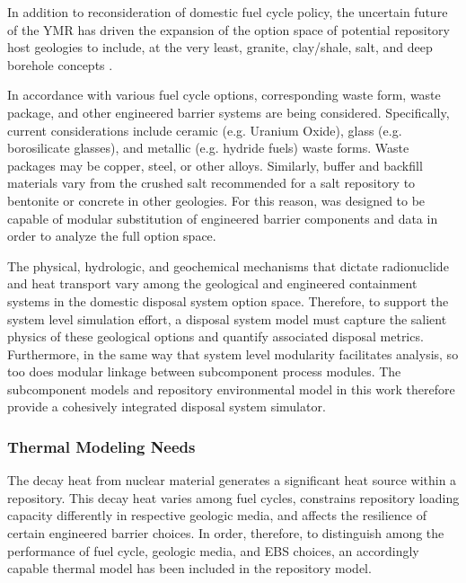 

In addition to reconsideration of domestic fuel cycle policy, the uncertain 
future of the \gls{YMR} has driven the expansion of the option space of 
potential repository host geologies to include, at the very least, granite, 
clay/shale, salt, and deep borehole concepts \cite{nutt_used_2010}. 


In accordance with various fuel cycle options, corresponding waste form, waste 
package, and other engineered barrier systems are being considered.  
Specifically, current considerations include ceramic (e.g.  Uranium Oxide), 
glass (e.g.  borosilicate glasses), and metallic (e.g.  hydride fuels) waste 
forms. Waste packages may be copper, steel, or other alloys. Similarly, buffer 
and backfill materials vary from the crushed salt recommended for a salt 
repository to bentonite or concrete in other geologies. For this reason, \Cyder
was designed to be capable of modular substitution of engineered barrier 
components and data in order to analyze the full option space.


The physical, hydrologic, and geochemical mechanisms that dictate 
radionuclide and heat transport vary among the geological and engineered 
containment systems in the domestic disposal system option space.  Therefore, 
to support the system level simulation effort, a disposal system model must
capture the salient physics of these geological options and quantify associated 
disposal metrics.  Furthermore, in the same way that system level 
modularity facilitates analysis, so too does modular linkage between subcomponent 
process modules. The subcomponent models and repository environmental model in 
this work therefore provide a cohesively integrated disposal system simulator.


\subsubsection{Thermal Modeling Needs}
The decay heat from nuclear material generates a significant heat source within 
a repository. This decay heat varies among fuel cycles, constrains repository 
loading capacity differently in respective geologic media, and affects the 
resilience of certain engineered barrier choices. In order, therefore, to 
distinguish among the performance of fuel cycle, geologic media, and \gls{EBS} 
choices, an accordingly capable thermal model has been included in the repository 
model. 


